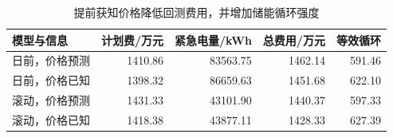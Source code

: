 \begin{table}[H]
\centering\small
\caption{提前获知价格降低回测费用，并增加储能循环强度}
\label{tab:price_information}
\begin{tabular}{lrrrr}\toprule
模型与信息 & 计划费/万元 & 紧急电量/kWh & 总费用/万元 & 等效循环 \\\midrule
日前，价格预测 & 1410.86 & 83563.75 & 1462.14 & 591.46 \\
日前，价格已知 & 1398.32 & 86659.63 & 1451.68 & 622.10 \\
滚动，价格预测 & 1431.33 & 43101.90 & 1440.37 & 597.33 \\
滚动，价格已知 & 1418.38 & 43877.11 & 1428.33 & 627.39 \\
\bottomrule\end{tabular}
\end{table}
